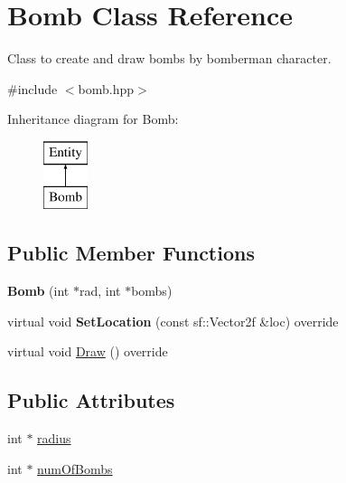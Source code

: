 \hypertarget{class_bomb}{}\section{Bomb Class Reference}
\label{class_bomb}


Class to create and draw bombs by bomberman character.  




{\ttfamily \#include $<$bomb.\+hpp$>$}

Inheritance diagram for Bomb\+:\begin{figure}[H]
\begin{center}
\leavevmode
\includegraphics[height=2.000000cm]{class_bomb}
\end{center}
\end{figure}
\subsection*{Public Member Functions}
\begin{DoxyCompactItemize}
\item 
\mbox{\label{class_bomb_abaf0b33ded4955358ae6af1a0419b732}} 
{\bfseries Bomb} (int $\ast$rad, int $\ast$bombs)
\item 
\mbox{\label{class_bomb_acb5962c43f9ce5d9ce63791fe66fcacb}} 
virtual void {\bfseries Set\+Location} (const sf\+::\+Vector2f \&loc) override
\item 
virtual void \mbox{\hyperlink{class_bomb_a307a7d181cd802b6ae7fb41505fd841f}{Draw}} () override
\end{DoxyCompactItemize}
\subsection*{Public Attributes}
\begin{DoxyCompactItemize}
\item 
int $\ast$ \mbox{\hyperlink{class_bomb_a7a23eb43b769a5d5fb79e76e6e969d5b}{radius}}
\item 
int $\ast$ \mbox{\hyperlink{class_bomb_a5ad60c615e2101551eae9197a84c16b9}{num\+Of\+Bombs}}
\end{DoxyCompactItemize}

